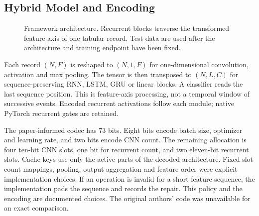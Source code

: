 \subsection{Hybrid Model and Encoding}
\begin{figure}[!t]\centering
{}


\caption{Framework architecture. Recurrent blocks traverse the transformed feature axis of one tabular record. Test data are used after the architecture and training endpoint have been fixed.}\label{fig:architecture}\end{figure}
Each record $(N,F)$ is reshaped to $(N,1,F)$ for one-dimensional convolution, activation and max pooling. The tensor is then transposed to $(N,L,C)$ for sequence-preserving RNN, LSTM, GRU or linear blocks. A classifier reads the last sequence position. This is feature-axis processing, not a temporal window of successive events. Encoded recurrent activations follow each module; native PyTorch recurrent gates are retained.

The paper-informed codec has 73 bits. Eight bits encode batch size, optimizer and learning rate, and two bits encode CNN count. The remaining allocation is four ten-bit CNN slots, one bit for recurrent count, and two eleven-bit recurrent slots. Cache keys use only the active parts of the decoded architecture. Fixed-slot count mappings, pooling, output aggregation and feature order were explicit implementation choices. If an operation is invalid for a short feature sequence, the implementation pads the sequence and records the repair. This policy and the encoding are documented choices. The original authors' code was unavailable for an exact comparison.


